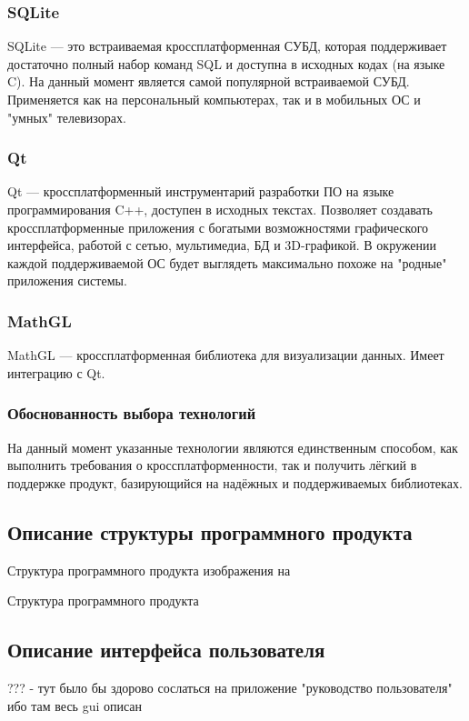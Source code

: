 \subsubsection{SQLite}
SQLite — это встраиваемая кроссплатформенная СУБД, которая поддерживает достаточно полный набор команд SQL и доступна в исходных кодах (на языке C). На данный
момент является самой популярной встраиваемой СУБД. Применяется как на персональный компьютерах, так и в мобильных ОС и "умных" телевизорах.

\subsubsection{Qt}
Qt — кроссплатформенный инструментарий разработки ПО на языке программирования C++, доступен в исходных текстах. Позволяет создавать кроссплатформенные приложения с богатыми возможностями
графического интерфейса, работой с сетью, мультимедиа, БД и 3D-графикой. В окружении каждой поддерживаемой ОС будет выглядеть максимально похоже на "родные" приложения
системы.

\subsubsection{MathGL}
MathGL — кроссплатформенная библиотека для визуализации данных. Имеет интеграцию с Qt.

\subsubsection{Обоснованность выбора технологий}
На данный момент указанные технологии являются единственным способом, как выполнить требования о кроссплатформенности, так и получить лёгкий в поддержке
продукт, базирующийся на надёжных и поддерживаемых библиотеках.

\subsection{Описание структуры программного продукта}
Структура программного продукта изображения на 

 {
  Структура программного продукта
}

\subsection{Описание интерфейса пользователя}
??? - тут было бы здорово сослаться на приложение "руководство пользователя" ибо там весь gui описан
